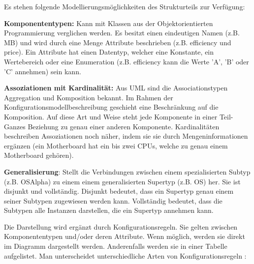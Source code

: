 \documentclass[12pt,a4paper,bibliography=totocnumbered,listof=totoc]{scrartcl}
\begin{document}
Es stehen folgende Modellierungsmöglichkeiten des Strukturteils zur Verfügung:
\begin{compactitem}
\item \textbf{Komponententypen:} Kann mit Klassen aus der Objektorientierten Programmierung verglichen werden. Es besitzt einen eindeutigen Namen (z.B. MB) und wird durch eine Menge Attribute beschrieben (z.B. efficiency und price). Ein Attribute hat einen Datentyp, welcher eine Konstante, ein Wertebereich oder eine Enumeration (z.B. efficiency kann die Werte 'A', 'B' oder 'C' annehmen) sein kann.
\item \textbf{Assoziationen mit Kardinalität:} Aus UML sind die Associationstypen Aggregation und Komposition bekannt. Im Rahmen der Konfigurationsmodellbeschreibung geschieht eine Beschränkung auf die Komposition. Auf diese Art und Weise steht jede Komponente in einer \glqq Teil-Ganzes\grqq{} Beziehung zu genau einer anderen Komponente. Kardinalitäten beschreiben Assoziationen noch näher, indem sie sie durch Mengeninformationen ergänzen (ein Motherboard hat ein bis zwei CPUs, welche zu genau einem Motherboard gehören).
\item \textbf{Generalisierung}: Stellt die Verbindungen zwischen einem spezialisierten Subtyp (z.B. OSAlpha) zu einem einem generalisierten Supertyp (z.B. OS) her. Sie ist disjunkt und vollständig. Disjunkt bedeutet, dass ein Supertyp genau einem seiner Subtypen zugewiesen werden kann. Vollständig bedeutet, dass die Subtypen alle Instanzen darstellen, die ein Supertyp annehmen kann.
\end{compactitem}

Die Darstellung wird ergänzt durch Konfigurationsregeln. Sie gelten zwischen Komponententypen und/oder deren Attribute. Wenn möglich, werden sie direkt im Diagramm dargestellt werden. Anderenfalls werden sie in einer Tabelle aufgelistet. Man unterscheidet unterschiedliche Arten von Konfigurationsregeln \citeauthor{felferning14}:
\end{document}
